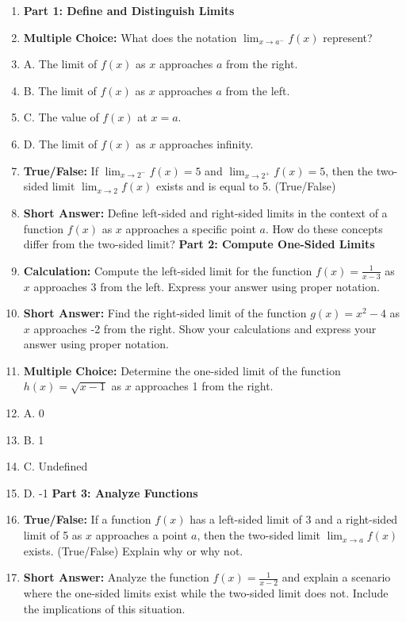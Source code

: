 \begin{enumerate}
    \item \textbf{Part 1: Define and Distinguish Limits}
    \item \textbf{Multiple Choice:} What does the notation $\lim_{x \to a^-} f(x)$ represent?
    \item A. The limit of $f(x)$ as $x$ approaches $a$ from the right.
    \item B. The limit of $f(x)$ as $x$ approaches $a$ from the left.
    \item C. The value of $f(x)$ at $x = a$.
    \item D. The limit of $f(x)$ as $x$ approaches infinity.
    \item \textbf{True/False:} If $\lim_{x \to 2^-} f(x) = 5$ and $\lim_{x \to 2^+} f(x) = 5$, then the two-sided limit $\lim_{x \to 2} f(x)$ exists and is equal to 5. (True/False)
    \item \textbf{Short Answer:} Define left-sided and right-sided limits in the context of a function $f(x)$ as $x$ approaches a specific point $a$. How do these concepts differ from the two-sided limit? \textbf{Part 2: Compute One-Sided Limits}
    \item \textbf{Calculation:} Compute the left-sided limit for the function $f(x) = \frac{1}{x - 3}$ as $x$ approaches 3 from the left. Express your answer using proper notation.
    \item \textbf{Short Answer:} Find the right-sided limit of the function $g(x) = x^2 - 4$ as $x$ approaches -2 from the right. Show your calculations and express your answer using proper notation.
    \item \textbf{Multiple Choice:} Determine the one-sided limit of the function $h(x) = \sqrt{x - 1}$ as $x$ approaches 1 from the right.
    \item A. 0
    \item B. 1
    \item C. Undefined
    \item D. -1 \textbf{Part 3: Analyze Functions}
    \item \textbf{True/False:} If a function $f(x)$ has a left-sided limit of 3 and a right-sided limit of 5 as $x$ approaches a point $a$, then the two-sided limit $\lim_{x \to a} f(x)$ exists. (True/False) Explain why or why not.
    \item \textbf{Short Answer:} Analyze the function $f(x) = \frac{1}{x - 2}$ and explain a scenario where the one-sided limits exist while the two-sided limit does not. Include the implications of this situation.

\end{enumerate}
